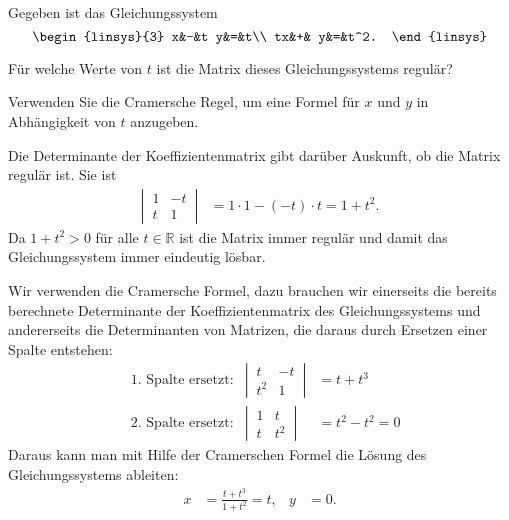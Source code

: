 Gegeben ist das Gleichungssystem
\[
\begin{linsys}{3}
 x&-&t y&=&t\\
tx&+&  y&=&t^2.
\end{linsys}
\]
\begin{teilaufgaben}
\item Für welche Werte von $t$ ist die Matrix dieses Gleichungssystems
regulär?
\item
Verwenden Sie die Cramersche Regel, um 
eine Formel für $x$ und $y$ in Abhängigkeit von $t$ anzugeben.
\end{teilaufgaben}


\begin{loesung}
\begin{teilaufgaben}
\item
Die Determinante der Koeffizientenmatrix gibt darüber Auskunft, ob die
Matrix regulär ist. Sie ist
\begin{align*}
\left|\,\begin{matrix}1&-t\\t&1\end{matrix}\,\right|
&=1\cdot 1-(-t)\cdot t=1+t^2.
\end{align*}
Da $1+t^2>0$ für alle $t\in\mathbb R$ ist die Matrix immer regulär und
damit das Gleichungssystem immer eindeutig lösbar.
\item
Wir verwenden die Cramersche Formel, dazu brauchen wir einerseits die bereits
berechnete Determinante der Koeffizientenmatrix des Gleichungssystems
und andererseits die Determinanten von Matrizen, die daraus durch Ersetzen
einer Spalte entstehen:
\begin{align*}
&\text{1.~Spalte ersetzt:}&
\left|\,\begin{matrix}t&-t\\t^2&1\end{matrix}\,\right|
&=t+t^3
\\
&\text{2.~Spalte ersetzt:}&
\left|\,\begin{matrix}1&t\\t&t^2\end{matrix}\,\right|
&=t^2-t^2=0
\end{align*}
Daraus kann man mit Hilfe der Cramerschen Formel die Lösung des
Gleichungssystems ableiten:
\begin{align*}
x&=\frac{t+t^3}{1+t^2}=t,&
y&=0.
\end{align*}
\qedhere
\end{teilaufgaben}
\end{loesung}
